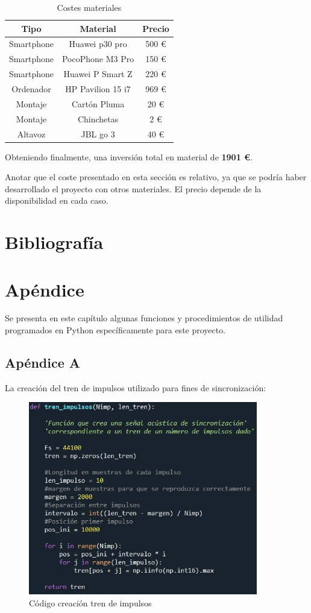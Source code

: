 \documentclass[a4paper,11pt]{book}
\begin{document}
\begin{table}[htbp]
\begin{center}
	\begin{tabular}{|c|c|c|}
\hline
\textbf{Tipo} &\textbf{Material} & \textbf{Precio} \\ 
\hline 
Smartphone & Huawei p30 pro & 500 \euro \\ 
\hline 
Smartphone & PocoPhone M3 Pro & 150 \euro \\ 
\hline 
Smartphone & Huawei P Smart Z & 220 \euro \\ 
\hline 
Ordenador & HP Pavilion 15 i7 & 969 \euro \\ 
\hline 
Montaje & Cartón Pluma & 20 \euro \\ 
\hline 
Montaje & Chinchetas & 2 \euro \\ 
\hline 
Altavoz & JBL go 3 & 40 \euro \\ 
\hline
	\end{tabular}
\caption{Costes materiales}
\end{center}
\end{table}
Obteniendo finalmente, una inversión total en material de \textbf{1901 \euro}.

Anotar que el coste presentado en esta sección es relativo, ya que se podría haber desarrollado el proyecto con otros materiales. El precio depende de la disponibilidad en cada caso.


\chapter{Bibliografía}



\chapter{Apéndice}
Se presenta en este capítulo algunas funciones y procedimientos de utilidad programados en Python específicamente para este proyecto.
\section{Apéndice A}
La creación del tren de impulsos utilizado para fines de sincronización:
\begin{figure}[hbtp]
\centering
\includegraphics[width = 10cm]{FIGURAS/creacion_impulsos_codigo.JPG}
\caption{Código creación tren de impulsos}
\end{figure}
\end{document}
